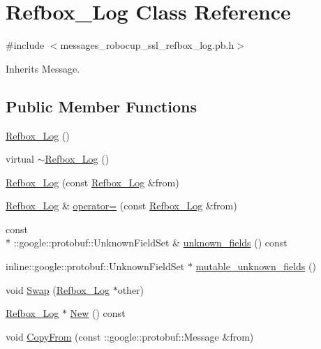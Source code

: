 \hypertarget{class_refbox___log}{\section{Refbox\-\_\-\-Log Class Reference}
\label{class_refbox___log}
}


{\ttfamily \#include $<$messages\-\_\-robocup\-\_\-ssl\-\_\-refbox\-\_\-log.\-pb.\-h$>$}



Inherits Message.

\subsection*{Public Member Functions}
\begin{DoxyCompactItemize}
\item 
\hyperlink{class_refbox___log_a2dc74639335b8a317a5950daa401cbfa}{Refbox\-\_\-\-Log} ()
\item 
virtual \hyperlink{class_refbox___log_a1eb7a9ffbb69e78e7440db5ea5f33f3f}{$\sim$\-Refbox\-\_\-\-Log} ()
\item 
\hyperlink{class_refbox___log_a3e9b19622e4f1a2502cb299a5861d883}{Refbox\-\_\-\-Log} (const \hyperlink{class_refbox___log}{Refbox\-\_\-\-Log} \&from)
\item 
\hyperlink{class_refbox___log}{Refbox\-\_\-\-Log} \& \hyperlink{class_refbox___log_a6e56fda614b167456dee4e77b197d746}{operator=} (const \hyperlink{class_refbox___log}{Refbox\-\_\-\-Log} \&from)
\item 
const \\*
\-::google\-::protobuf\-::\-Unknown\-Field\-Set \& \hyperlink{class_refbox___log_ad3b7d0fcd8cfed079b01b69778304ef6}{unknown\-\_\-fields} () const 
\item 
inline\-::google\-::protobuf\-::\-Unknown\-Field\-Set $\ast$ \hyperlink{class_refbox___log_a0d22f45f7237cd1ec6534fc689c8499c}{mutable\-\_\-unknown\-\_\-fields} ()
\item 
void \hyperlink{class_refbox___log_a5e780531abd1dd12f78cb13a60ca7e12}{Swap} (\hyperlink{class_refbox___log}{Refbox\-\_\-\-Log} $\ast$other)
\item 
\hyperlink{class_refbox___log}{Refbox\-\_\-\-Log} $\ast$ \hyperlink{class_refbox___log_afbf86125b3d90b568bb43151beb11c4d}{New} () const 
\item 
void \hyperlink{class_refbox___log_aa99ebe7cb410697df48297837d343f97}{Copy\-From} (const \-::google\-::protobuf\-::\-Message \&from)
\item 

\end{DoxyCompactItemize}
